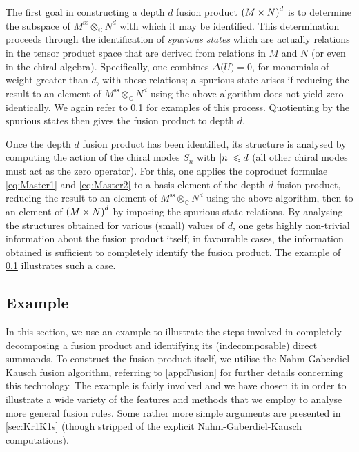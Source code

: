 \documentclass[a4paper,reqno,12pt]{report}
\theoremstyle{definition}
\numberwithin{equation}{section}
\let\originalleft\left     %
\let\originalright\right
\renewcommand{\left}{\mathopen{}\mathclose\bgroup\originalleft}
\renewcommand{\right}{\aftergroup\egroup\originalright}
\newcommand{\brac}[1]{\left( #1 \right)}
\newcommand{\abs}[1]{\left\lvert #1 \right\rvert}
\newcommand{\CC}{\mathbb{C}}
\newcommand{\spsub}[1]{#1^{\text{ss}}}       %
\newcommand{\fuse}{\mathbin{\times}}                                            %
\newcommand{\coproductsymb}{\Delta}                                                %
\newcommand{\coproduct}[1]{\coproductsymb \bigl( #1 \bigr)}                        %
\newcommand{\NGK}{Nahm-Gaberdiel-Kausch}
\renewcommand{\le}{\leqslant}
\theoremstyle{plain}
\begin{document}
The first goal in constructing a depth $d$ fusion product $\brac{M \fuse N}^d$ is to determine the subspace of $\spsub{M} \otimes_{\CC} N^d$ with which it may be identified.  This determination proceeds through the identification of \emph{spurious states} which are actually relations in the tensor product space that are derived from relations in $M$ and $N$ (or even in the chiral algebra).  Specifically, one combines $\coproduct{U} = 0$, for monomials of weight greater than $d$, with these relations; a spurious state arises if reducing the result to an element of $\spsub{M} \otimes_{\CC} N^d$ using the above algorithm does not yield zero identically.  We again refer to \cref{sec:TheExample} for examples of this process.  Quotienting by the spurious states then gives the fusion product to depth $d$.

Once the depth $d$ fusion product has been identified, its structure is analysed by computing the action of the chiral modes $S_n$ with $\abs{n} \le d$ (all other chiral modes must act as the zero operator).  For this, one applies the coproduct formulae \eqref{eq:Master1} and \eqref{eq:Master2} to a basis element of the depth $d$ fusion product, reducing the result to an element of $\spsub{M} \otimes_{\CC} N^d$ using the above algorithm, then to an element of $\brac{M \times N}^d$ by imposing the spurious state relations.  By analysing the structures obtained for various (small) values of $d$, one gets highly non-trivial information about the fusion product itself; in favourable cases, the information obtained is sufficient to completely identify the fusion product.  The example of \cref{sec:TheExample} illustrates such a case.

\subsection{Example} \label{sec:TheExample}

In this section, we use an example to illustrate the steps involved in completely decomposing a fusion product and identifying its (indecomposable) direct summands.  To construct the fusion product itself, we utilise the Nahm-Gaberdiel-Kausch fusion algorithm, referring to \cref{app:Fusion} for further details concerning this technology.  The example is fairly involved and we have chosen it in order to illustrate a wide variety of the features and methods that we employ to analyse more general fusion rules.  Some rather more simple arguments are presented in \cref{sec:Kr1K1s} (though stripped of the explicit \NGK{} computations).
\end{document}
